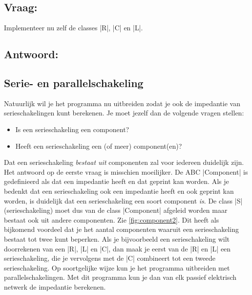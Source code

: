 \begin{cpplstShortInline}
\subsection*{Vraag:}
Implementeer nu zelf de classes |R|, |C| en |L|.

\subsection*{Antwoord:}
\vspace{-.4\baselineskip}

\subsection{Serie- en parallelschakeling}
Natuurlijk wil je het programma nu uitbreiden zodat je ook de impedantie van serieschakelingen kunt berekenen.
Je moet jezelf dan de volgende vragen stellen:
\begin{itemize}
    \item Is een serieschakeling een component?
    \item Heeft een serieschakeling een (of meer) component(en)?
\end{itemize}

Dat een serieschakeling \emph{bestaat uit} componenten zal voor iedereen duidelijk zijn.
Het antwoord op de eerste vraag is misschien moeilijker.
De ABC |Component| is gedefinieerd als  dat een impedantie heeft en dat geprint kan worden.
Als je bedenkt dat een serieschakeling ook een impedantie heeft en ook geprint kan worden, is duidelijk dat een serieschakeling een soort component \emph{is}.
De class |S| (serieschakeling) moet dus van de class |Component| afgeleid worden maar bestaat ook uit andere componenten. Zie \cref{fig:component2}.
Dit heeft als bijkomend voordeel dat je het aantal componenten waaruit een serieschakeling bestaat tot twee kunt beperken.
Als je bijvoorbeeld een serieschakeling wilt doorrekenen van een |R|, |L| en |C|, dan maak je eerst van de |R| en |L| een serieschakeling, die je vervolgens met de |C| combineert tot een tweede serieschakeling.
Op soortgelijke wijze kun je het programma uitbreiden met parallelschakelingen.
Met dit programma kun je dan van elk passief elektrisch netwerk de impedantie berekenen.



\end{cpplstShortInline}
